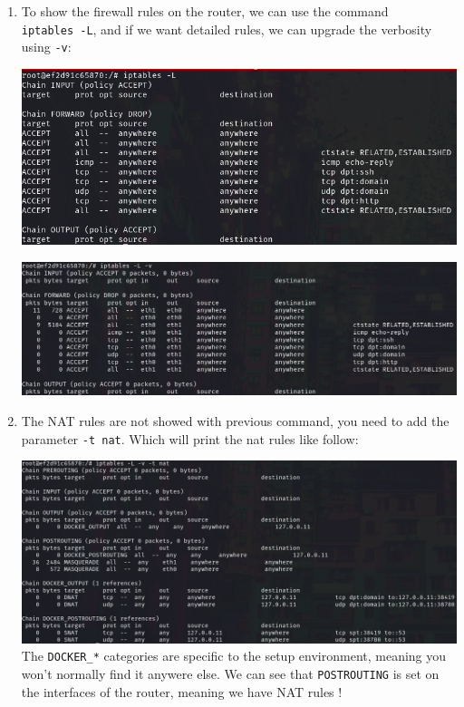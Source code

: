 \documentclass[a4paper,11pt,singlespacing]{article}
\begin{document}
\begin{enumerate}
\def\labelenumi{\arabic{enumi}.}
\item
  To show the firewall rules on the router, we can use the command
  \texttt{iptables\ -L}, and if we want detailed rules, we can upgrade
  the verbosity using \texttt{-v}:

  \includegraphics{Images/Image01.png}

  \includegraphics{Images/Image02.png}
\item
  The NAT rules are not showed with previous command, you need to add
  the parameter \texttt{-t\ nat}. Which will print the nat rules like
  follow:

  \includegraphics{Images/Image03.png}
  The \texttt{DOCKER\_*} categories are specific to the setup
  environment, meaning you won't normally find it anywere else. We can
  see that \texttt{POSTROUTING} is set on the interfaces of the router,
  meaning we have NAT rules !

\newpage
  

\end{enumerate}
\end{document}
